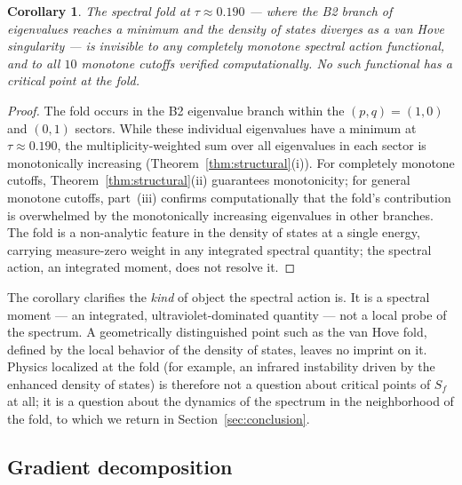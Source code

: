 \documentclass[12pt]{article}
\newtheorem{corollary}[theorem]{Corollary}
\theoremstyle{definition}
\theoremstyle{remark}
\begin{document}
\begin{corollary}
The spectral fold at $\tau \approx 0.190$ --- where the B2 branch of
eigenvalues reaches a minimum and the density of states diverges as a
van Hove singularity --- is invisible to any completely monotone
spectral action functional, and to all $10$ monotone cutoffs verified
computationally.  No such functional has a critical point at the fold.
\end{corollary}

\begin{proof}
The fold occurs in the B2 eigenvalue branch within the
$(p,q) = (1,0)$ and $(0,1)$ sectors.  While these individual
eigenvalues have a minimum at $\tau \approx 0.190$, the
multiplicity-weighted sum over all eigenvalues in each sector is
monotonically increasing (Theorem~\ref{thm:structural}(i)).  For
completely monotone cutoffs, Theorem~\ref{thm:structural}(ii)
guarantees monotonicity; for general monotone cutoffs, part~(iii)
confirms computationally that the fold's contribution is overwhelmed
by the monotonically increasing eigenvalues in other branches.  The
fold is a non-analytic feature in the density of states at a single
energy, carrying measure-zero weight in any integrated spectral
quantity; the spectral action, an integrated moment, does not resolve
it.
\end{proof}

The corollary clarifies the \emph{kind} of object the spectral action
is.  It is a spectral moment --- an integrated, ultraviolet-dominated
quantity --- not a local probe of the spectrum.  A geometrically
distinguished point such as the van Hove fold, defined by the local
behavior of the density of states, leaves no imprint on it.  Physics
localized at the fold (for example, an infrared instability driven by
the enhanced density of states) is therefore not a question about
critical points of $S_f$ at all; it is a question about the dynamics of
the spectrum in the neighborhood of the fold, to which we return in
Section~\ref{sec:conclusion}.


\subsection{Gradient decomposition}
\end{document}
